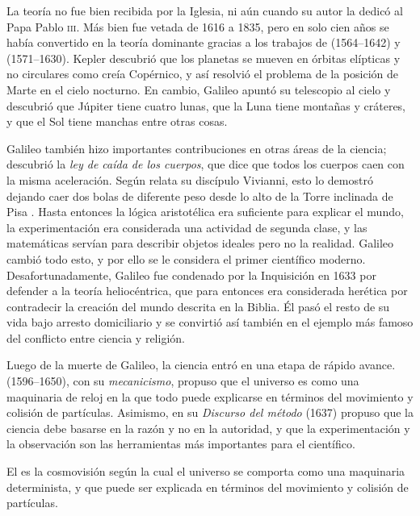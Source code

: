 La teoría no fue bien recibida por la Iglesia, ni aún cuando su autor la dedicó
al Papa Pablo \textsc{iii}.
Más bien fue vetada de 1616 a 1835, pero en solo cien años se había convertido
en la teoría dominante gracias a los trabajos de  (1564--1642) y 
(1571--1630).
Kepler descubrió que los planetas se mueven en órbitas elípticas y no circulares
como creía Copérnico, y así resolvió el problema de la posición de Marte en el
cielo nocturno.
En cambio, Galileo apuntó su telescopio al cielo y descubrió que Júpiter tiene
cuatro lunas, que la Luna tiene montañas y cráteres, y que el Sol tiene manchas
entre otras cosas.

Galileo también hizo importantes contribuciones en otras áreas de la ciencia;
descubrió la \emph{ley de caída de los cuerpos}, que dice que todos los cuerpos
caen con la misma aceleración.
Según relata su discípulo Vivianni, esto lo demostró dejando caer dos bolas de
diferente peso desde lo alto de la Torre inclinada de Pisa
\cite{Viviani2019}.
Hasta entonces la lógica aristotélica era suficiente para explicar el mundo, la
experimentación era considerada una actividad de segunda clase, y las
matemáticas servían para describir objetos ideales pero no la realidad.
Galileo cambió todo esto, y por ello se le considera el primer científico
moderno.
Desafortunadamente, Galileo fue condenado por la Inquisición en 1633 por
defender a la teoría heliocéntrica, que para entonces era considerada herética
por contradecir la creación del mundo descrita en la Biblia.
Él pasó el resto de su vida bajo arresto domiciliario y se convirtió así también
en el ejemplo más famoso del conflicto entre ciencia y religión.

Luego de la muerte de Galileo, la ciencia entró en una etapa de rápido avance.
 (1596--1650), con su
\emph{mecanicismo}, propuso que el universo es como una
maquinaria de reloj en la que todo puede explicarse en términos del movimiento
y colisión de partículas.
Asimismo, en su \emph{Discurso del método} (1637) propuso que la ciencia debe
basarse en la razón y no en la autoridad, y que la experimentación y la
observación son las herramientas más importantes para el científico.

\begin{remember}
    \label{rem:mecanicismo}
    El  es la cosmovisión según la cual
    el universo se comporta como una maquinaria determinista, y que puede ser
    explicada en términos del movimiento y colisión de partículas.
\end{remember}

